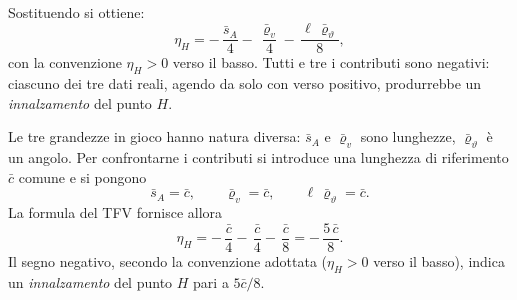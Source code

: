 \begin{esempio}
\begin{svolgimento}
		Sostituendo si ottiene:
		\begin{equation*}
			\eta_H = 	-\,\frac{\bar s_A}{4} -\,\frac{\bar\varrho_v}{4} -\,\frac{\ell\,\bar\varrho_\vartheta}{8},
		\end{equation*}
		con la convenzione $\eta_H>0$ verso il basso. Tutti e tre i 
		contributi sono negativi: ciascuno dei tre dati reali, agendo 
		da solo con verso positivo, produrrebbe un \emph{innalzamento} 
		del punto $H$.
		
		
		Le tre grandezze in gioco hanno natura diversa: $\bar s_A$ e 
		$\bar\varrho_v$ sono lunghezze, $\bar\varrho_\vartheta$ è un 
		angolo. Per confrontarne i contributi si introduce una lunghezza 
		di riferimento $\bar c$ comune e si pongono
		\begin{equation*}
			\bar s_A = \bar c, \qquad
			\bar\varrho_v = \bar c, \qquad
			\ell\,\bar\varrho_\vartheta = \bar c.
		\end{equation*}
		La formula del TFV fornisce allora
		\begin{equation*}
			\eta_H = -\,\frac{\bar c}{4} -\,\frac{\bar c}{4} 
			-\,\frac{\bar c}{8} = -\,\frac{5\,\bar c}{8}.
		\end{equation*}
		Il segno negativo, secondo la convenzione adottata 
		($\eta_H>0$ verso il basso), indica un \emph{innalzamento} 
		del punto $H$ pari a $5\bar c/8$.
		

\end{svolgimento}
\end{esempio}

